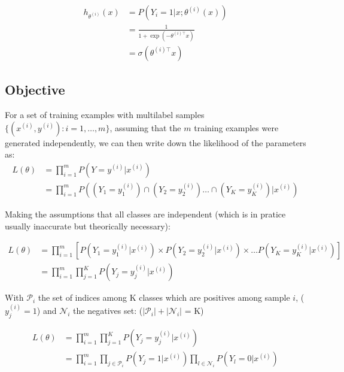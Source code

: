 \begin{align}
	h_{\theta^{(i)}}(x) 
	&= P(Y_i = 1 | x; \theta^{(i)}(x)) \\
	&= \frac{1}{1 + \exp(-\theta^{(i)\top} x)}\\
	&= \sigma(\theta^{(i)\top} x)
\end{align}




\subsection{Objective}


For a set of training examples with multilabel samples $\{ (x^{(i)}, y^{(i)}) : i=1,\ldots,m\}$, assuming that the $m$ training examples were generated independently, we can then write down the likelihood of the parameters as:
\begin{align}
	L(\theta) &= \prod_{i=1}^m P(Y=y^{(i)} | x^{(i)} ) \\
			  &= \prod_{i=1}^m P((Y_1=y_1^{(i)}) \cap (Y_2=y_2^{(i)}) \dots \cap (Y_K=y_K^{(i)})| x^{(i)})
\end{align}

Making the assumptions that all classes are independent (which is in pratice usually inaccurate but theorically necessary):

\begin{align}
	L(\theta) &= \prod_{i=1}^m \left[ P(Y_1=y_1^{(i)} | x^{(i)}) \times P(Y_2=y_2^{(i)} | x^{(i)}) \times \dots P(Y_K=y_K^{(i)} | x^{(i)}) \right] \\
			  &= \prod_{i=1}^m \prod_{j=1}^K P(Y_j=y_j^{(i)} | x^{(i)}) 
\end{align}

With $\mathcal{P}_i$ the set of indices among K classes which are positives among sample $i$, ($y_j^{(i)}=1$) and $\mathcal{N}_i$ the negatives set: ($|\mathcal{P}_i| + |\mathcal{N}_i|$ = K)

\begin{align}
	L(\theta) &= \prod_{i=1}^m \prod_{j=1}^K P(Y_j=y_j^{(i)} | x^{(i)}) \\
			  &= \prod_{i=1}^m  \prod_{j \in \mathcal{P}_i } P(Y_j=1 | x^{(i)}) \prod_{l \in \mathcal{N}_i} P(Y_l=0 | x^{(i)})  \\
\end{align}


